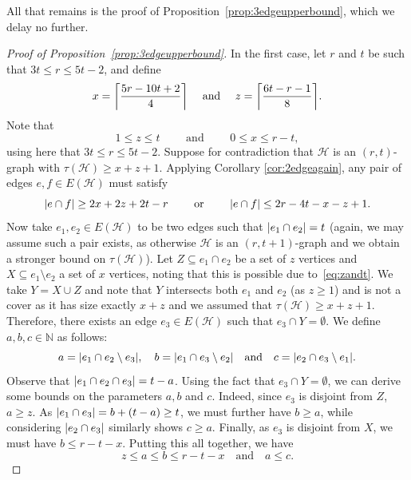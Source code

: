 \documentclass[a4paper,twoside,11pt]{article}
\DeclarePairedDelimiter{\ceil}{\lceil}{\rceil}
\DeclarePairedDelimiter{\card}{|}{|}
\numberwithin{thm}{section}
\theoremstyle{definition}
\theoremstyle{remark}
\theoremstyle{definition}
\def\cH{{\mathcal H}}
\newcommand{\m}[1]{\mathcal{#1}}
\begin{document}
All that remains is the proof of Proposition~\ref{prop:3edgeupperbound}, which we delay no further.

\begin{proof}[Proof of Proposition~\ref{prop:3edgeupperbound}]
In the first case, let $r$ and $t$ be such that $3t\leq r \leq 5t-2$, and define
\[x =\ceil*{\frac{5r-10t + 2}{4}} \quad \mbox{ and } \quad z =\ceil*{\frac{6t-r-1}{8}}.\]
Note that  \begin{equation} \label{eq:zandt}
    1\leq z \leq t \qquad \mbox{ and } \qquad 0\leq x \leq r-t,
\end{equation}
using here that $3t\leq r \leq 5t-2$.
Suppose for contradiction that $\m H$ is an $(r,t)$-graph with $\tau(\cH)\geq x+z+1$. Applying Corollary \ref{cor:2edgeagain}, any pair of edges $e,f\in E(\cH)$ must satisfy
\begin{equation} \label{eq:2edgerestriction}
    \card{e\cap f} \geq  2x+2z +2t -r \qquad
\mbox{ or } \qquad 
\card{e\cap f} \leq 2r-4t-x-z+1.
\end{equation}
Now take $e_1, e_2\in E(\cH)$ to be two edges such that $\card{e_1\cap e_2}=t$ (again, we may assume such a pair exists, as otherwise $\m H$ is an $(r,t+1)$-graph and we obtain a stronger bound on $\tau(\m H)$).  Let $Z\subseteq e_1\cap e_2$ be a set of $z$ vertices and $X \subseteq e_1 \setminus e_2$ a set of $x$ vertices, noting that this is possible due to~\eqref{eq:zandt}. We take $Y=X\cup Z$ and note that $Y$ intersects both $e_1$ and $e_2$ (as $z\geq 1$) and is not a cover as it has size exactly $x+z$ and we assumed that $\tau(\cH)\geq x+z+1$. Therefore, there exists an edge $e_3 \in E(\m H)$ such that $e_3\cap Y=\emptyset$. We define $a,b,c \in \mathbb{N}$ as follows:
\[ a = \card{e_1\cap e_2 \setminus e_3}, \quad b = \card{e_1\cap e_3 \setminus e_2} \quad \mbox{and} \quad c = \card{e_2\cap e_3\setminus e_1}. \]
Observe that $\card{e_1\cap e_2 \cap e_3}=t-a$. Using the fact that $e_3 \cap Y=\emptyset$, we can derive some bounds on the parameters $a, b$ and $c$. Indeed, since $e_3$ is disjoint from $Z$, $a \ge z$.  As $\card{e_1 \cap e_3} = b + (t-a) \ge t$, we must further have $b \ge a$, while considering $\card{e_2 \cap e_3}$ similarly shows $c \ge a$.  Finally, as $e_3$ is disjoint from $X$, we must have $b \le r - t - x$.  Putting this all together, we have
\begin{equation} \label{eq:spaceboundaries}
    z \leq a \leq b \leq r-t-x \quad \mbox{and} \quad a \le c. 
\end{equation}


\end{proof}
\end{document}
